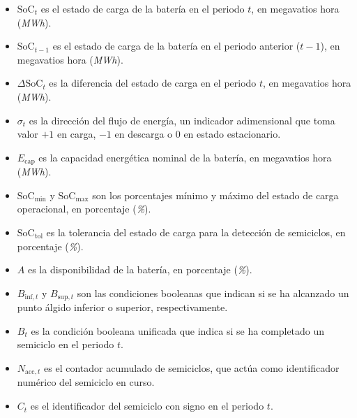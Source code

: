 \begin{itemize}

  \item \( \mathrm{SoC}_{t} \) es el estado de carga de la batería en el periodo \( t \), en megavatios hora (\textit{MWh}).

  \item \( \mathrm{SoC}_{t-1} \) es el estado de carga de la batería en el periodo anterior (\( t-1 \)), en megavatios hora (\textit{MWh}).

  \item \( \Delta \mathrm{SoC}_{t} \) es la diferencia del estado de carga en el periodo \( t \), en megavatios hora (\textit{MWh}).

  \item \( \sigma_{t} \) es la dirección del flujo de energía, un indicador adimensional que toma valor \(+1\) en carga, \(-1\) en descarga o \(0\) en estado estacionario.

  \item \( E_{\text{cap}} \) es la capacidad energética nominal de la batería, en megavatios hora (\textit{MWh}).

  \item \( \mathrm{SoC}_{\text{min}} \) y \( \mathrm{SoC}_{\text{max}} \) son los porcentajes mínimo y máximo del estado de carga operacional, en porcentaje (\textit{\%}).

  \item \( \mathrm{SoC}_{\text{tol}} \) es la tolerancia del estado de carga para la detección de semiciclos, en porcentaje (\textit{\%}).

  \item \( A \) es la disponibilidad de la batería, en porcentaje (\textit{\%}).

  \item \( B_{\text{inf}, t} \) y \( B_{\text{sup}, t} \) son las condiciones booleanas que indican si se ha alcanzado un punto álgido inferior o superior, respectivamente.

  \item \( B_{t} \) es la condición booleana unificada que indica si se ha completado un semiciclo en el periodo \( t \).

  \item \( N_{\text{acc}, t} \) es el contador acumulado de semiciclos, que actúa como identificador numérico del semiciclo en curso.

  \item \( C_{t} \) es el identificador del semiciclo con signo en el periodo \( t \).


\end{itemize}
